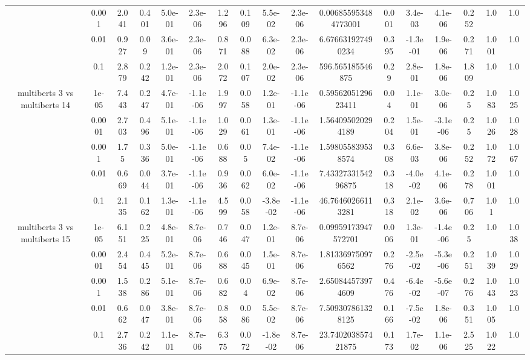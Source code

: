 \begin{tabular}{|c|c|c|c|c|c|c|c|c|c|c|c|c|c|c|c|c|}
 & 0.001 & 2.041 & 0.401 & 5.0e-01 & 2.3e-06 & 1.296 & 0.109 & 5.5e-02 & 2.3e-06 & 0.006855953484773001 & 0.001 & 3.4e-03 & 4.1e-06 & 0.252 & 1.0 & 1.0 \\
 & 0.01 & 0.927 & 0.09 & 3.6e-01 & 2.3e-06 & 0.871 & 0.088 & 6.3e-02 & 2.3e-06 & 6.676631927490234 & 0.395 & -1.3e-01 & 1.9e-06 & 0.271 & 1.001 & 1.0 \\
 & 0.1 & 2.879 & 0.242 & 1.2e-01 & 2.3e-06 & 2.072 & 0.107 & 2.0e-02 & 2.3e-06 & 596.565185546875 & 0.29 & 2.8e-01 & 1.8e-06 & 1.809 & 1.0 & 1.0 \\
\hline
\multirow{5}{*}{multiberts 3 vs multiberts 14} & 1e-05 & 7.443 & 0.247 & 4.7e-01 & -1.1e-06 & 1.997 & 0.058 & 1.2e-01 & -1.1e-06 & 0.5956205129623411 & 0.04 & 1.1e-01 & 3.0e-06 & 0.25 & 1.083 & 1.025 \\
 & 0.0001 & 2.703 & 0.496 & 5.1e-01 & -1.1e-06 & 1.029 & 0.061 & 1.3e-01 & -1.1e-06 & 1.564095020294189 & 0.204 & 1.5e-01 & -3.1e-06 & 0.25 & 1.026 & 1.028 \\
 & 0.001 & 1.75 & 0.336 & 5.0e-01 & -1.1e-06 & 0.688 & 0.05 & 7.4e-02 & -1.1e-06 & 1.598055839538574 & 0.308 & 6.6e-03 & 3.8e-06 & 0.252 & 1.072 & 1.067 \\
 & 0.01 & 0.669 & 0.044 & 3.7e-01 & -1.1e-06 & 0.936 & 0.062 & 6.0e-02 & -1.1e-06 & 7.4332733154296875 & 0.318 & -4.0e-02 & 4.1e-06 & 0.278 & 1.001 & 1.0 \\
 & 0.1 & 2.135 & 0.162 & 1.3e-01 & -1.1e-06 & 4.599 & 0.058 & -3.8e-02 & -1.1e-06 & 46.76460266113281 & 0.318 & 2.1e-02 & 3.6e-06 & 0.706 & 1.01 & 1.0 \\
\hline
\multirow{5}{*}{multiberts 3 vs multiberts 15} & 1e-05 & 6.151 & 0.225 & 4.8e-01 & 8.7e-06 & 0.746 & 0.047 & 1.2e-01 & 8.7e-06 & 0.09959173947572701 & 0.006 & 1.3e-01 & -1.4e-06 & 0.25 & 1.0 & 1.038 \\
 & 0.0001 & 2.454 & 0.445 & 5.2e-01 & 8.7e-06 & 0.688 & 0.045 & 1.5e-01 & 8.7e-06 & 1.813369750976562 & 0.276 & -2.5e-02 & -5.3e-06 & 0.251 & 1.039 & 1.029 \\
 & 0.001 & 1.538 & 0.286 & 5.1e-01 & 8.7e-06 & 0.682 & 0.04 & 6.9e-02 & 8.7e-06 & 2.650844573974609 & 0.476 & -6.4e-02 & -5.6e-07 & 0.276 & 1.043 & 1.023 \\
 & 0.01 & 0.662 & 0.047 & 3.8e-01 & 8.7e-06 & 0.858 & 0.086 & 5.5e-02 & 8.7e-06 & 7.509307861328125 & 0.166 & -7.5e-02 & 1.8e-06 & 0.351 & 1.005 & 1.0 \\
 & 0.1 & 2.736 & 0.242 & 1.1e-01 & 8.7e-06 & 6.375 & 0.072 & -1.8e-02 & 8.7e-06 & 23.740203857421875 & 0.173 & 1.7e-02 & 1.1e-06 & 2.525 & 1.022 & 1.0 \\

\end{tabular}

